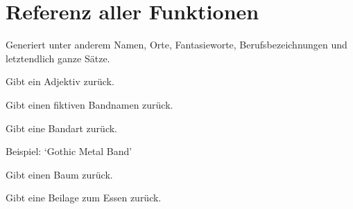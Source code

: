 \documentclass[a4paper,12pt,oneside]{sphinxmanual}
\begin{document}
\section{Referenz aller Funktionen}
\label{funktionen:referenz-aller-funktionen}\label{funktionen::doc}\label{funktionen:module-pyzufall}
Generiert unter anderem Namen, Orte, Fantasieworte, Berufsbezeichnungen und letztendlich ganze Sätze.

\begin{fulllineitems}
\label{funktionen:pyzufall.adj}
Gibt ein Adjektiv zurück.

\end{fulllineitems}


\begin{fulllineitems}
\label{funktionen:pyzufall.band}
Gibt einen fiktiven Bandnamen zurück.

\end{fulllineitems}


\begin{fulllineitems}
\label{funktionen:pyzufall.bandart}
Gibt eine Bandart zurück.

Beispiel: `Gothic Metal Band'

\end{fulllineitems}


\begin{fulllineitems}
\label{funktionen:pyzufall.baum}
Gibt einen Baum zurück.

\end{fulllineitems}


\begin{fulllineitems}
\label{funktionen:pyzufall.beilage}
Gibt eine Beilage zum Essen zurück.

\end{fulllineitems}

\end{document}
